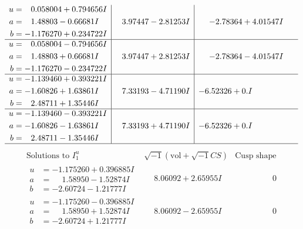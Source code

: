 \documentclass[1p]{elsarticle_modified}
\theoremstyle{definition}
\newcommand{\I}{\sqrt{-1}}
\begin{document}
$$\begin{array}{c|c|c}
\begin{aligned}
u &= \phantom{-}0.058004 + 0.794656 I \\
a &= \phantom{-}1.48803 - 0.66681 I \\
b &= -1.176270 + 0.234722 I\end{aligned}
 & \phantom{-}3.97447 - 2.81253 I & -2.78364 + 4.01547 I \\ \hline\begin{aligned}
u &= \phantom{-}0.058004 - 0.794656 I \\
a &= \phantom{-}1.48803 + 0.66681 I \\
b &= -1.176270 - 0.234722 I\end{aligned}
 & \phantom{-}3.97447 + 2.81253 I & -2.78364 - 4.01547 I \\ \hline\begin{aligned}
u &= -1.139460 + 0.393221 I \\
a &= -1.60826 + 1.63861 I \\
b &= \phantom{-}2.48711 + 1.35446 I\end{aligned}
 & \phantom{-}7.33193 - 4.71190 I & -6.52326 + 0. I\phantom{ +0.000000I} \\ \hline\begin{aligned}
u &= -1.139460 - 0.393221 I \\
a &= -1.60826 - 1.63861 I \\
b &= \phantom{-}2.48711 - 1.35446 I\end{aligned}
 & \phantom{-}7.33193 + 4.71190 I & -6.52326 + 0. I\phantom{ +0.000000I}\\
 \hline 
 \end{array}$$\newpage$$\begin{array}{c|c|c}  
\text{Solutions to }I^u_{1}& \I (\text{vol} + \sqrt{-1}CS) & \text{Cusp shape}\\
 \hline 
\begin{aligned}
u &= -1.175260 + 0.396885 I \\
a &= \phantom{-}1.58950 - 1.52874 I \\
b &= -2.60724 - 1.21777 I\end{aligned}
 & \phantom{-}8.06092 + 2.65955 I & \phantom{-0.000000 } 0 \\ \hline\begin{aligned}
u &= -1.175260 - 0.396885 I \\
a &= \phantom{-}1.58950 + 1.52874 I \\
b &= -2.60724 + 1.21777 I\end{aligned}
 & \phantom{-}8.06092 - 2.65955 I & \phantom{-0.000000 } 0 \\ \hline\begin{aligned}

\end{aligned}
\end{array}$$
\end{document}
